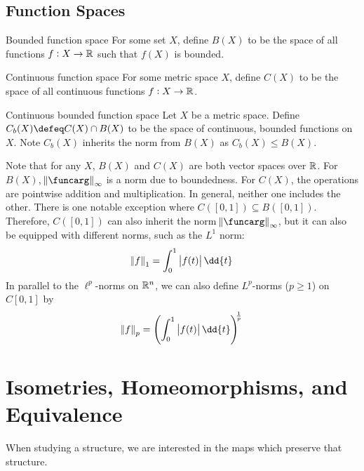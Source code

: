 \documentclass{styles/tufte}
\begin{document}
\subsection{Function Spaces}
  
  \begin{definition}{Bounded function space}{}
    For some set $X$, define $B(X)$ to be the space of all functions $f: X \to \mathbb{R}$ such that $f(X)$ is bounded.
  \end{definition}
  
  \begin{definition}{Continuous function space}{}
    For some metric space $X$, define $C(X)$ to be the space of all continuous functions $f: X \to \mathbb{R}$.
  \end{definition}
  
  \begin{definition}{Continuous bounded function space}{}
    Let $X$ be a metric space. Define $C_b(X) \defeq C(X) \cap B(X)$ to be the space of continuous, bounded functions on $X$. Note $C_b(X)$ inherits the norm from $B(X)$ as $C_b(X) \leqslant B(X)$.
  \end{definition}
  
  Note that for any $X$, $B(X)$ and $C(X)$ are both vector spaces over $\mathbb{R}$. For $B(X)$, $\norm{\funcarg}_\infty$ is a norm due to boundedness. For $C(X)$, the operations are pointwise addition and multiplication. In general, neither one includes the other. There is one notable exception where $C([0, 1]) \subseteq B([0, 1])$. Therefore, $C([0, 1])$ can also inherit the norm $\norm{\funcarg}_\infty$, but it can also be equipped with different norms, such as the $L^1$ norm:
  \[ \norm{f}_1 = \int_0^1 \abs{f(t)} \dd{t} \]
  In parallel to the $\ell^p$-norms on $\mathbb{R}^n$, we can also define $L^p$-norms ($p \geqslant 1$) on $C[0,1]$ by
  \[ \norm{f}_p = \left( \int_0^1 \abs{f(t)} \dd{t} \right)^{\hspace{-0.25em}\frac{1}{p}} \]



\section{Isometries, Homeomorphisms, and Equivalence}

When studying a structure, we are interested in the maps which preserve that structure.
\end{document}
